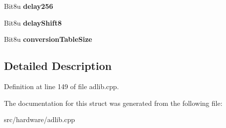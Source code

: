 \begin{DoxyCompactItemize}
\item 
\hypertarget{structAdlib_1_1RawHeader_a1fd40a8fe5a9771c58e969db0a9e0386}{Bit8u {\bfseries delay256}}\label{structAdlib_1_1RawHeader_a1fd40a8fe5a9771c58e969db0a9e0386}

\item 
\hypertarget{structAdlib_1_1RawHeader_a73598973dbc467633ad076135d19223a}{Bit8u {\bfseries delay\-Shift8}}\label{structAdlib_1_1RawHeader_a73598973dbc467633ad076135d19223a}

\item 
\hypertarget{structAdlib_1_1RawHeader_a11b787b47fad2e30661ff1846811c823}{Bit8u {\bfseries conversion\-Table\-Size}}\label{structAdlib_1_1RawHeader_a11b787b47fad2e30661ff1846811c823}

\end{DoxyCompactItemize}


\subsection{Detailed Description}


Definition at line 149 of file adlib.\-cpp.



The documentation for this struct was generated from the following file\-:\begin{DoxyCompactItemize}
\item 
src/hardware/adlib.\-cpp\end{DoxyCompactItemize}
